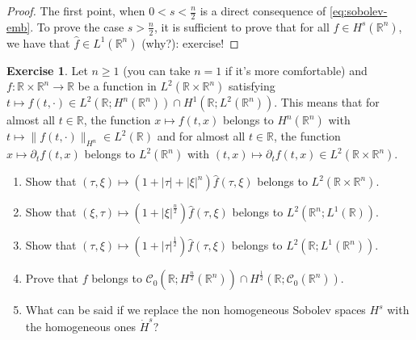 \documentclass[a4paper, 12pt]{article}
\theoremstyle{plain}
\theoremstyle{definition}
\newtheorem{exercise}{Exercise}
\theoremstyle{remark}
\numberwithin{equation}{section}
\begin{document}
\begin{proof}
The first point, when $0<s<\frac{n}{2}$ is a direct consequence of \eqref{eq:sobolev-emb}. To prove the case $s>\frac{n}{2}$, it is sufficient
to prove that for all $f\in H^s({\mathds{R}}^n)$, we have that $\hat{f}\in L^1({\mathds{R}}^n)$ (why?): exercise!
\end{proof}

\begin{exercise}
Let $n\ge 1$ (you can take $n=1$ if it's more comfortable) and $f:{\mathds{R}}\times {\mathds{R}}^n\to {\mathds{R}}$ be 
a function in $L^2({\mathds{R}}\times{\mathds{R}}^n)$ satisfying
$t\mapsto f(t,\cdot) \in L^2({\mathds{R}};H^n({\mathds{R}}^n))\cap H^1({\mathds{R}};L^2({\mathds{R}}^n))$. This means that for almost all
$t\in{\mathds{R}}$, the function $x\mapsto f(t,x)$ belongs to $H^n({\mathds{R}}^n)$ with $t\mapsto \|f(t,\cdot)\|_{H^n} \in L^2({\mathds{R}})$ and 
for almost all $t\in{\mathds{R}}$, the function $x\mapsto \partial_tf(t,x)$ belongs to $L^2({\mathds{R}}^n)$ with
$(t,x)\mapsto \partial_tf(t,x) \in L^2({\mathds{R}}\times{\mathds{R}}^n)$.
%
\begin{enumerate}
\item
Show that $(\tau,\xi)\mapsto (1+|\tau|+|\xi|^n)\hat{f}(\tau,\xi)$ belongs to $L^2({\mathds{R}}\times{\mathds{R}}^n)$.
\item
Show that  
$(\xi,\tau)\mapsto (1+|\xi|^{\frac{n}{2}})\hat{f}(\tau,\xi)$ belongs to $L^2({\mathds{R}}^n;L^1({\mathds{R}}))$.
\item
Show that 
$(\tau,\xi)\mapsto (1+|\tau|^{\frac{1}{2}})\hat{f}(\tau,\xi)$ belongs to $L^2({\mathds{R}};L^1({\mathds{R}}^n))$.
\item
Prove that $f$ belongs to ${\mathscr{C}}_0({\mathds{R}};H^{\frac{n}{2}}({\mathds{R}}^n))
\cap H^{\frac{1}{2}}({\mathds{R}};{\mathscr{C}}_0({\mathds{R}}^n))$.
\item
What can be said if we replace the non homogeneous Sobolev spaces $H^s$ with the homogeneous ones $\dot H^s$?
\end{enumerate}
\end{exercise}
\end{document}
